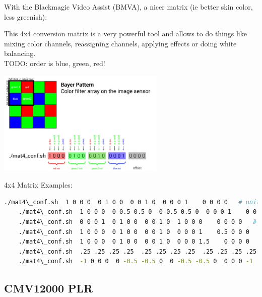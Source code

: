 With the Blackmagic Video Assist (BMVA), a nicer matrix (ie better skin color, less greenish): 


This 4x4 conversion matrix is a very powerful tool and allows to do things like mixing color channels, reassigning channels, applying effects or doing white balancing.\\

TODO: order is blue, green, red! 

\begin{center}
\includegraphics[height=5cm]{images/700px-Mat4-conf-illustration-01}
\end{center}

4x4 Matrix Examples:

\begin{lstlisting}[language=bash,morekeywords=$,keywordstyle=\bfseries,frame=none,xleftmargin=.25in,belowskip=2em, aboveskip=2em]
    ./mat4\_conf.sh  1 0 0 0  0 1 0 0  0 0 1 0  0 0 0 1    0 0 0 0   # unity matrix but not optimal as both green channels are processed separately
    ./mat4\_conf.sh  1 0 0 0  0 0.5 0.5 0  0 0.5 0.5 0  0 0 0 1    0 0 0 0   # the two green channels inside each 2x2 pixel block are averaged and output on both green pixels
    ./mat4\_conf.sh  0 0 0 1  0 1 0 0  0 0 1 0  1 0 0 0    0 0 0 0   # red and blue are swapped
    ./mat4\_conf.sh  1 0 0 0  0 1 0 0  0 0 1 0  0 0 0 1    0.5 0 0 0    # red 50% brigther
    ./mat4\_conf.sh  1 0 0 0  0 1 0 0  0 0 1 0  0 0 0 1.5    0 0 0 0    # blue multiplied with factor 1.5
    ./mat4\_conf.sh  .25 .25 .25 .25  .25 .25 .25 .25  .25 .25 .25 .25  .25 .25 .25 .25    0 0 0 0    # black/white
    ./mat4\_conf.sh  -1 0 0 0  0 -0.5 -0.5 0  0 -0.5 -0.5 0  0 0 0 -1    1 1 1 1    # negative
\end{lstlisting}






\subsection{CMV12000 PLR}

